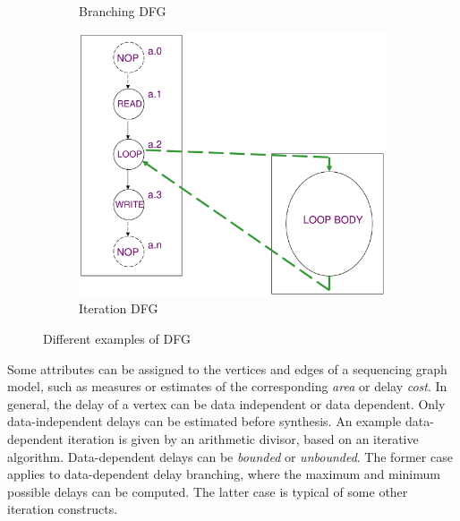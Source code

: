 \begin{figure}[H]
\begin{subfigure}[b]{0.2\textwidth}
        \caption{Branching DFG}
        \label{fig:BranchingDFG}
    \end{subfigure}
    \quad
    \begin{subfigure}[b]{0.2\textwidth}
        \includegraphics[width=\textwidth]{./Cap2/Images/Image12.png}
        \caption{Iteration DFG}
        \label{fig:IterationDFG}
    \end{subfigure}
    \label{fig:DFGs}
    \caption{Different examples of DFG}
\end{figure}
Some attributes can be assigned to the vertices and edges of a sequencing graph model, such as measures or estimates of the corresponding \textit{area} or delay \textit{cost}. In general, the delay of  a  vertex can be  data independent  or  data dependent.  Only data-independent delays can be estimated before synthesis. An example data-dependent iteration is given by an arithmetic divisor, based on an iterative algorithm. Data-dependent delays can be  \textit{bounded}  or  \textit{unbounded}.  The former case applies to data-dependent delay branching, where the maximum and minimum possible delays can be computed. The latter case is typical of some other iteration constructs.